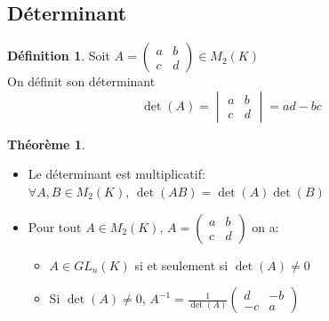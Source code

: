 \documentclass[10pt,a4paper]{article}
\theoremstyle{definition}
\newtheorem{theorem}[proposition]{Théorème}
\newtheorem{definition}[proposition]{Définition}
\begin{document}
\subsection{Déterminant}
\begin{definition}
Soit $A = \begin{pmatrix}
a & b \\
c & d
\end{pmatrix} \in M_2(K)$ \\
On définit son déterminant
\[ \det(A) = \begin{vmatrix}
a & b \\
c & d
\end{vmatrix} = ad - bc \]
\end{definition}
\begin{theorem}
\hfill \begin{itemize}
\item Le déterminant est multiplicatif: \\
$\forall A, B \in M_2(K)$, $\det(AB) = \det(A) \det(B)$
\item Pour tout $A \in M_2(K)$, $A = \begin{pmatrix}
a & b \\
c & d
\end{pmatrix}$ on a:
\begin{itemize}
\item $A \in GL_n(K)$ si et seulement si $\det(A) \neq 0$
\item Si $\det(A) \neq 0$, $A^{-1} = \frac{1}{\det(A)} \begin{pmatrix}
d & -b \\
-c & a
\end{pmatrix}$
\end{itemize}
\end{itemize}
\end{theorem}
\end{document}

